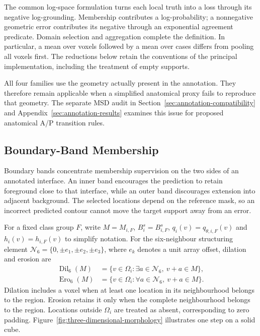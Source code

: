 \documentclass[12pt,a4paper]{article}
\begin{document}
The common log-space formulation turns each local truth into a loss
through its negative log-grounding. Membership contributes a
log-probability; a nonnegative geometric error contributes its negative
through an exponential agreement predicate. Domain selection and
aggregation complete the definition. In particular, a mean over voxels
followed by a mean over cases differs from pooling all voxels first.
The reductions below retain the conventions of the principal
implementation, including the treatment of empty supports.

All four families use the geometry actually present in the annotation.
They therefore remain applicable when a simplified anatomical proxy
fails to reproduce that geometry. The separate MSD audit in
Section~\ref{sec:annotation-compatibility} and Appendix~\ref{sec:annotation-results}
examines this issue for proposed anatomical A/P transition rules.

\subsection{Boundary-Band Membership}\label{sec:boundary-band-constraints}

Boundary bands concentrate membership supervision on the two sides of an
annotated interface. An inner band encourages the prediction to retain
foreground close to that interface, while an outer band discourages
extension into adjacent background. The selected locations depend on the
reference mask, so an incorrect predicted contour cannot move the target
support away from an error.

For a fixed class group $F$, write $M=M_{i,F}$, $B_i^s=B_{i,F}^s$,
$q_i(v)=q_{\theta,i,F}(v)$ and $h_i(v)=h_{i,F}(v)$ to simplify notation.
For the six-neighbour structuring element
$\mathcal N_6=\{0,\pm e_1,\pm e_2,\pm e_3\}$, where $e_k$ denotes
a unit array offset, dilation and erosion are
\begin{equation}
\begin{aligned}
\operatorname{Dil}_6(M)
 &=\{v\in\Omega_i:\exists a\in\mathcal{N}_6,\ v+a\in M\},\\
\operatorname{Ero}_6(M)
 &=\{v\in\Omega_i:\forall a\in\mathcal{N}_6,\ v+a\in M\}.
\end{aligned}
\label{eq:band-morphology}
\end{equation}
Dilation includes a voxel when at least one location in its neighbourhood
belongs to the region. Erosion retains it only when the complete
neighbourhood belongs to the region. Locations outside $\Omega_i$ are
treated as absent, corresponding to zero padding.
Figure~\ref{fig:three-dimensional-morphology} illustrates one step on
a solid cube.
\end{document}
